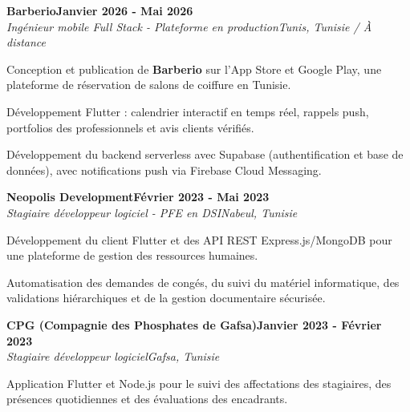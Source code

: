 \documentclass[letterpaper,10pt]{article}
\newcommand{\heading}[2]{\hspace{10pt}#1\hfill#2\\}
\newcommand{\headingBf}[2]{\heading{\textbf{#1}}{\textbf{#2}}}
\newcommand{\headingIt}[2]{\heading{\textit{#1}}{\textit{#2}}}
\newenvironment{resume_list}{
  \vspace{-7pt}
  \begin{itemize}[itemsep=-2pt, parsep=1pt, leftmargin=30pt]
}{
  \end{itemize}
}
\begin{document}
\newpage

\headingBf{Barberio}{Janvier 2026 - Mai 2026}

\headingIt{Ingénieur mobile Full Stack - Plateforme en production}{Tunis, Tunisie / À distance}

\begin{resume_list}

  \item Conception et publication de \textbf{Barberio} sur l'App Store et Google Play, une plateforme de réservation de salons de coiffure en Tunisie.

  \item Développement Flutter : calendrier interactif en temps réel, rappels push, portfolios des professionnels et avis clients vérifiés.

  \item Développement du backend serverless avec Supabase (authentification et base de données), avec notifications push via Firebase Cloud Messaging.

\end{resume_list}

\headingBf{Neopolis Development}{Février 2023 - Mai 2023}

\headingIt{Stagiaire développeur logiciel - PFE en DSI}{Nabeul, Tunisie}

\begin{resume_list}

  \item Développement du client Flutter et des API REST Express.js/MongoDB pour une plateforme de gestion des ressources humaines.

  \item Automatisation des demandes de congés, du suivi du matériel informatique, des validations hiérarchiques et de la gestion documentaire sécurisée.

\end{resume_list}

\headingBf{CPG (Compagnie des Phosphates de Gafsa)}{Janvier 2023 - Février 2023}

\headingIt{Stagiaire développeur logiciel}{Gafsa, Tunisie}

\begin{resume_list}

  \item Application Flutter et Node.js pour le suivi des affectations des stagiaires, des présences quotidiennes et des évaluations des encadrants.

\end{resume_list}
\end{document}
